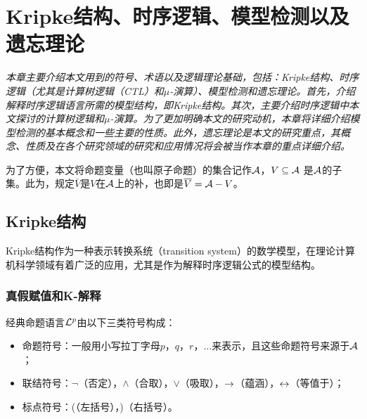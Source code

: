 \chapter{Kripke结构、时序逻辑、模型检测以及遗忘理论}\label{chapter02}

{\em 本章主要介绍本文用到的符号、术语以及逻辑理论基础，包括：Kripke结构、时序逻辑（尤其是计算树逻辑（CTL）和$\mu$-演算）、模型检测和遗忘理论。首先，介绍解释时序逻辑语言所需的模型结构，即Kripke结构。其次，主要介绍时序逻辑中本文探讨的计算树逻辑和$\mu$-演算。为了更加明确本文的研究动机，本章将详细介绍模型检测的基本概念和一些主要的性质。此外，遗忘理论是本文的研究重点，其概念、性质及在各个研究领域的研究和应用情况将会被当作本章的重点详细介绍。

为了方便，本文将命题变量（也叫原子命题）的集合记作$\cal A$，$V\subseteq {\cal A}$ 是$\cal A$的子集。此为，规定$\overline{V}$是$V$在${\cal A}$上的补，也即是$\overline{V}={\cal A}-V$。}

\section{Kripke结构}
Kripke结构作为一种表示转换系统（transition system）的数学模型，在理论计算机科学领域有着广泛的应用，尤其是作为解释时序逻辑公式的模型结构。

\subsection{真假赋值和K-解释}
经典命题语言${\cal L}^p$由以下三类符号构成：
\begin{itemize}
	\item 命题符号：一般用小写拉丁字母$p$，$q$，$r$，$\dots$来表示，且这些命题符号来源于${\cal A}$；
	\item 联结符号：$\neg$（否定），$\wedge$（合取），$\vee$（吸取），$\rightarrow$（蕴涵），$\leftrightarrow$（等值于）；
	\item 标点符号：(（左括号），)（右括号）。
\end{itemize}

